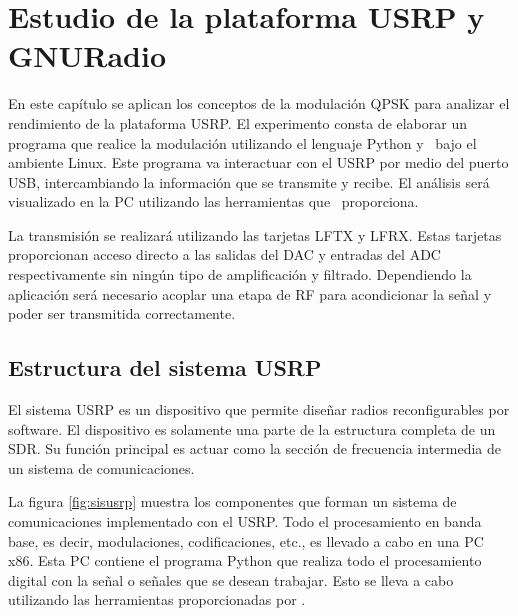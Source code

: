 \chapter{Estudio de la plataforma USRP y GNURadio}
\label{ch:estudio}

En este cap\'itulo se aplican los conceptos de la modulaci\'on QPSK para
analizar el rendimiento de la plataforma USRP. El experimento consta de elaborar
un programa que realice la modulaci\'on utilizando el lenguaje Python y
\gnuradio\ bajo el ambiente Linux. Este programa va interactuar con el USRP
por medio del puerto USB, intercambiando la informaci\'on que se transmite y
recibe. El an\'alisis ser\'a visualizado en la PC utilizando las herramientas
que \gnuradio\ proporciona.

La transmisi\'on se realizar\'a utilizando las tarjetas LFTX y LFRX. Estas
tarjetas proporcionan acceso directo a las salidas del DAC y entradas del ADC
respectivamente sin ning\'un tipo de amplificaci\'on y filtrado. Dependiendo la
aplicaci\'on ser\'a necesario acoplar una etapa de RF para acondicionar la
se\~nal y poder ser transmitida correctamente.

\section{Estructura del sistema USRP}

El sistema USRP es un dispositivo que permite dise\~nar radios reconfigurables
por software. El dispositivo es solamente una parte de la estructura completa de
un SDR. Su funci\'on principal es actuar como la secci\'on de frecuencia intermedia de un sistema de
comunicaciones.

La figura \ref{fig:sisusrp} muestra los componentes que forman un sistema de
comunicaciones implementado con el USRP. Todo el procesamiento en banda base, es decir,
modulaciones, codificaciones, etc., es llevado a cabo en una PC x86. Esta PC
contiene el programa Python que realiza todo el procesamiento digital con la
se\~nal o se\~nales que se desean trabajar. Esto se lleva a cabo utilizando las
herramientas proporcionadas por \gnuradio.

